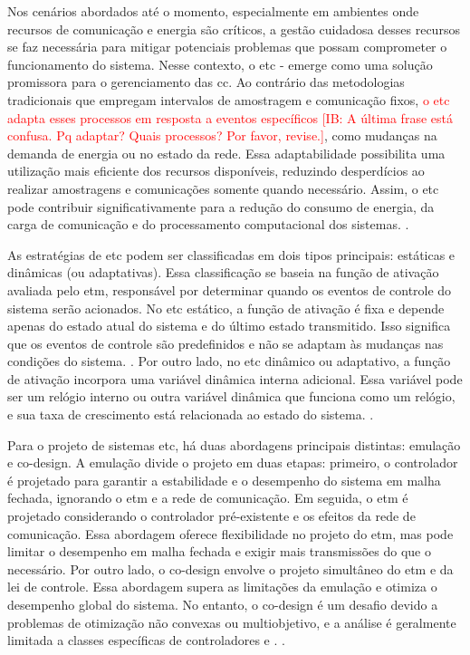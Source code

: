 Nos cenários abordados até o momento, especialmente em ambientes onde recursos de comunicação e energia são críticos, a gestão cuidadosa desses recursos se faz necessária para mitigar potenciais problemas que possam comprometer o funcionamento do sistema. Nesse contexto, o \acrfull{etc} - emerge como uma solução promissora para o gerenciamento das  \acrshort{cc}. Ao contrário das metodologias tradicionais que empregam intervalos de amostragem e comunicação fixos,  \textcolor{red}{ o \acrshort{etc} adapta esses processos em resposta a eventos específicos [IB: A última frase está confusa. Pq adaptar? Quais processos? Por favor, revise.]}, como mudanças na demanda de energia ou no estado da rede. Essa adaptabilidade possibilita uma utilização mais eficiente dos recursos disponíveis, reduzindo desperdícios ao realizar amostragens e comunicações somente quando necessário. Assim, o \acrshort{etc} pode contribuir significativamente para a redução do consumo de energia, da carga de comunicação e do processamento computacional dos sistemas. \cite{coutinho2021}.

As estratégias de \acrshort{etc} podem ser classificadas em dois tipos principais: estáticas e dinâmicas (ou adaptativas). Essa classificação se baseia na função de ativação avaliada pelo \acrshort{etm}, responsável por determinar quando os eventos de controle do sistema serão acionados. No \acrshort{etc} estático, a função de ativação é fixa e depende apenas do estado atual do sistema e do último estado transmitido. Isso significa que os eventos de controle são predefinidos e não se adaptam às mudanças nas condições do sistema. \cite{coutinho2021}. Por outro lado, no \acrshort{etc} dinâmico ou adaptativo, a função de ativação incorpora uma variável dinâmica interna adicional. Essa variável pode ser um relógio interno ou outra variável dinâmica que funciona como um relógio, e sua taxa de crescimento está relacionada ao estado do sistema. \cite{Girard2015}.

Para o projeto de sistemas \acrshort{etc}, há duas abordagens principais distintas: emulação e co-design. A emulação divide o projeto em duas etapas: primeiro, o controlador é projetado para garantir a estabilidade e o desempenho do sistema em malha fechada, ignorando o \acrshort{etm} e a rede de comunicação. Em seguida, o \acrshort{etm} é projetado considerando o controlador pré-existente e os efeitos da rede de comunicação. Essa abordagem oferece flexibilidade no projeto do \acrshort{etm}, mas pode limitar o desempenho em malha fechada e exigir mais transmissões do que o necessário. Por outro lado, o co-design envolve o projeto simultâneo do \acrshort{etm} e da lei de controle. Essa abordagem supera as limitações da emulação e otimiza o desempenho global do sistema. No entanto, o co-design é um desafio devido a problemas de otimização não convexas ou multiobjetivo, e a análise é geralmente limitada a classes específicas de controladores e . \cite{coutinho2021}.


